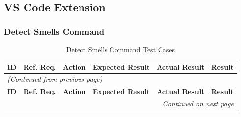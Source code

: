 \documentclass[12pt, titlepage]{article}
\begin{document}
\subsection{VS Code Extension}

\subsubsection{Detect Smells Command}

\begin{longtable}{c 
  >{\raggedright\arraybackslash}p{1.5cm} 
  >{\raggedright\arraybackslash}p{4.5cm} 
  >{\raggedright\arraybackslash}p{4cm} 
  >{\raggedright\arraybackslash}p{3cm} c}
  \toprule
  \textbf{ID} & \textbf{Ref. Req.} & \textbf{Action} & \textbf{Expected Result} & \textbf{Actual Result} & \textbf{Result} \\ 
  \midrule
  \endfirsthead

  \multicolumn{6}{l}{\textit{(Continued from previous page)}} \\ 
  \toprule
  \textbf{ID} & \textbf{Ref. Req.} & \textbf{Action} & \textbf{Expected Result} & \textbf{Actual Result} & \textbf{Result} \\ 
  \midrule
  \endhead

  \multicolumn{6}{r}{\textit{Continued on next page}} \\
  \endfoot

  \bottomrule
  \caption{Detect Smells Command Test Cases}
  \label{table:plugin_detect_command_tests}
  \endlastfoot


\end{longtable}
\end{document}
